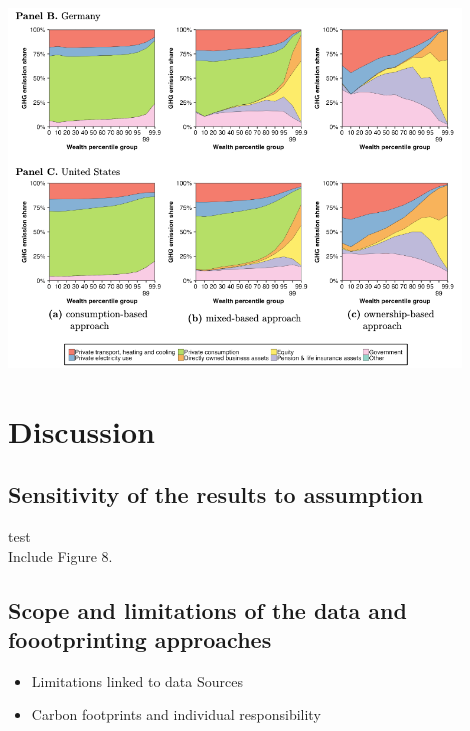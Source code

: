 \documentclass[10pt]{beamer}
\begin{document}
\begin{frame}{\subsecname}
    \begin{center}
        \includegraphics[width=0.9\textwidth]{../Figures/F72.png}
    \end{center}
\end{frame}

\section{Discussion}
\begin{frame}{\secname}
    \tableofcontents[currentsection, hideothersubsections, sections=\value{section}]
\end{frame}

\subsection{Sensitivity of the results to assumption}
\begin{frame}{\subsecname}
    test \\
    Include Figure 8.
\end{frame}

\subsection{Scope and limitations of the data and foootprinting approaches}
\begin{frame}{\subsecname}
    \begin{itemize}
        \item Limitations linked to data Sources
        \item Carbon footprints and individual responsibility
    \end{itemize}
\end{frame}
\end{document}
